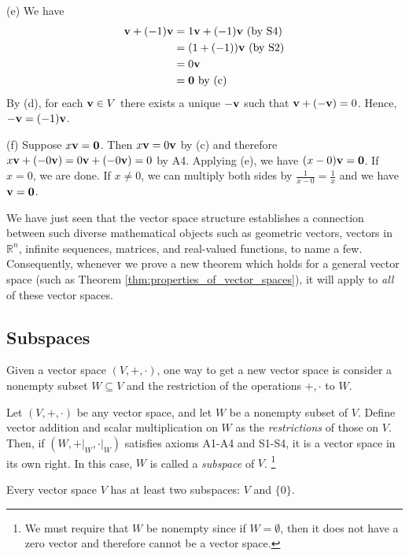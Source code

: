 \documentclass[12pt,letterpaper,reqno]{article}
\numberwithin{equation}{section}
\begin{document}
\begin{pf}
(e) We have
	\begin{align*}
		{\bf v}+(-1){\bf v} &=1{\bf v}+(-1){\bf v} \text{ (by S4)}\\
		&=(1+(-1)){\bf v} \text{ (by S2)}\\
		&=0{\bf v} \\
		&={\bf 0} \text{ by (c)}
	\end{align*}
By (d), for each ${\bf v} \in V$ there exists a unique $-{\bf v}$ such that ${\bf v}+(-{\bf v})=0$. Hence, $-{\bf v}=(-1){\bf v}$.

(f) Suppose $x{\bf v}={\bf 0}$. Then $x{\bf v}=0{\bf v}$ by (c) and therefore $x{\bf v}+(-0{\bf v})=0{\bf v}+(-0{\bf v})=0$ by A4. Applying (e), we have $(x-0){\bf v}={\bf 0}$. If $x=0$, we are done. If $x \neq 0$, we can multiply both sides by $\frac{1}{x-0}=\frac{1}{x}$ and we have ${\bf v}={\bf 0}$.
\end{pf}

We have just seen that the vector space structure establishes a connection between such diverse mathematical objects such as geometric vectors, vectors in $\mathbb{R}^n$, infinite sequences, matrices, and real-valued functions, to name a few. Consequently, whenever we prove a new theorem which holds for a general vector space (such as Theorem \ref{thm:properties_of_vector_spaces}), it will apply to \emph{all} of these vector spaces.

\subsection{Subspaces}
Given a vector space $(V,+,\cdot)$, one way to get a new vector space is consider a nonempty subset $W \subseteq V$ and the restriction of the operations $+,\cdot$ to $W$.
 
\begin{defn}[Subspace]\label{def:subspace}
 Let $(V,+,\cdot)$ be any vector space, and let $W$ be a nonempty subset of $V$. Define vector addition and scalar multiplication on $W$ as the \emph{restrictions} of those on $V$.
Then, if $(W,+\vert_W, \cdot \vert_W)$ satisfies axioms A1-A4 and S1-S4, it is a vector space in its own right. In this case, $W$ is called a \emph{subspace} of $V$. \footnote{We must require that $W$ be nonempty since if $W=\emptyset$, then it does not have a zero vector and therefore cannot be a vector space.}	
\end{defn}

\begin{prop}\label{prop:trivial_subspaces}
	Every vector space $V$ has at least two subspaces: $V$ and $\{0\}$.
\end{prop}
\end{document}
